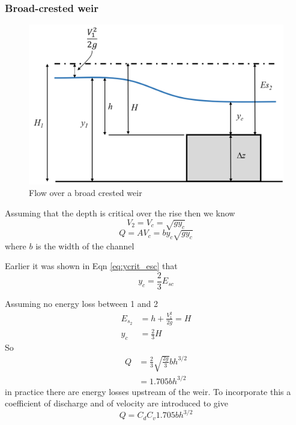 \documentclass[a4paper, 12pt, british]{article} %
\numberwithin{equation}{section}
\numberwithin{figure}{section}
\numberwithin{table}{section}
\begin{document}
\subsubsection{Broad-crested weir}

\begin{figure}[H]
	\centering
	\includegraphics[scale=0.7]{./images/flow_over_broad_crested_weir.png}
	\caption{Flow over a broad crested weir}
	\label{fig:1181}
\end{figure} 

Assuming that the depth is critical over the rise then we know
\begin{equation*}
V_2 = V_c = \sqrt{gy_c}
\end{equation*} 
\begin{equation*}
Q = AV_c = by_c\sqrt{gy_c}
\end{equation*} 
where $b$ is the width of the channel

Earlier it was shown in Eqn \ref{eq:ycrit_esc} that 
\begin{equation*}
y_c = \frac{2}{3}E_{sc}
\end{equation*} 

Assuming no energy loss between 1 and 2
\begin{align*}
E_{s_2} &= h + \frac{V_1^2}{2g} = H \\
y_c &= \frac{2}{3}H
\end{align*}
So
\begin{align*}
Q &= \frac{2}{3} \sqrt{\frac{2g}{3}}bh^{3/2} \\
&= 1.705 bh^{3/2}
\end{align*}
in practice there are energy losses upstream of the weir. To incorporate this a coefficient of discharge and of velocity are introduced to give
\begin{equation}
Q = C_d C_v 1.705 bh^{3/2}
\label{eq:broad_crested_wweir}
\end{equation}
\end{document}

